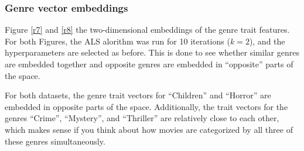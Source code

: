 \documentclass{article}
\begin{document}
\subsubsection{Genre vector embeddings}
Figure \ref{r7} and \ref{r8} the two-dimensional embeddings of the genre trait features.
For both Figures, the ALS alorithm was run for 10 iterations ($k = 2$), and the hyperparameters are selected as before.
This is done to see whether similar genres are embedded together and opposite genres are embedded in ``opposite''
parts of the space.

For both datasets, the genre trait vectors for ``Children'' and ``Horror'' are embedded in opposite parts of the space.
Additionally, the trait vectors for the genres ``Crime'', ``Mystery'', and ``Thriller'' are relatively close to each other,
which makes sense if you think about how movies are categorized by all three of these genres simultaneously.
\end{document}
